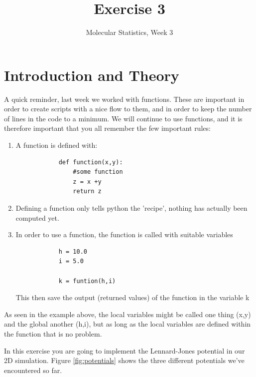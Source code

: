 \documentclass{article}
\title{Exercise 3}
\author{Molecular Statistics, Week 3}
\date{}
\begin{document}

\maketitle


\section{Introduction and Theory}
A quick reminder, last week we worked with functions. These are important in order to create scripts with a nice flow to them, and in order to keep the number of lines in the code to a minimum. 
We will continue to use functions, and it is therefore important that you all remember the few important rules:

\begin{enumerate}
        \item A function is defined with:
            \begin{lstlisting}
            def function(x,y):
                #some function 
                z = x +y
                return z
            \end{lstlisting}
        \item Defining a function only tells python the 'recipe', nothing has actually been computed yet.
        \item In order to use a function, the function is called with suitable variables
            \begin{lstlisting}
            h = 10.0
            i = 5.0
            
            k = funtion(h,i)
            \end{lstlisting}
            This then save the output (returned values) of the function in the variable k
\end{enumerate}
As seen in the example above, the local variables might be called one thing (x,y) and the global another (h,i), but as long as the local variables are defined within the function that is no problem. 


In this exercise you are going to implement the Lennard-Jones potential in our 2D simulation.
Figure \ref{fig:potentials} shows the three different potentials we've encountered so far.
\end{document}

